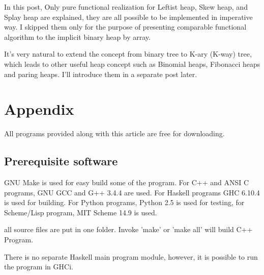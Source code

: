 \documentclass{article}
\begin{document}
In this post, Only pure functional realization for Leftist heap, 
Skew heap, and Splay heap are explained, they are all possible to
be implemented in imperative way. I skipped them only for the 
purpose of presenting comparable functional algorithm to the
implicit binary heap by array.

It's very natural to extend the concept from binary tree to
K-ary (K-way) tree, which leads to other useful heap concept such as
Binomial heaps, Fibonacci heaps and paring heaps. I'll introduce
them in a separate post later.

\section{Appendix} \label{appendix}
All programs provided along with this article are free for
downloading.

\subsection{Prerequisite software}
GNU Make is used for easy build some of the program. For C++ and ANSI C programs,
GNU GCC and G++ 3.4.4 are used. 
For Haskell programs GHC 6.10.4 is used
for building. For Python programs, Python 2.5 is used for testing, for
Scheme/Lisp program, MIT Scheme 14.9 is used.

all source files are put in one folder. Invoke 'make' or 'make all'
will build C++ Program. 

There is no separate Haskell main program module, however, it is possible to run the program in GHCi.
\end{document}
